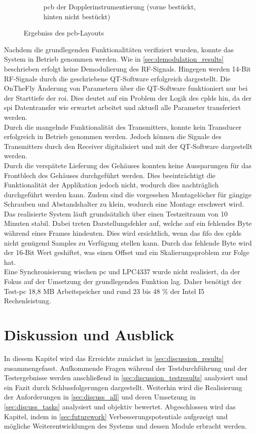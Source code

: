 \begin{figure}[h!]
\begin{subfigure}[b]{1\textwidth}
    	\caption{\ac{pcb} der Dopplerinstrumentierung (vorne bestückt, hinten nicht bestückt)}
		\label{fig:3Dpcb}
    \end{subfigure}
	\caption{Ergebniss des \acs{pcb}-Layouts}\label{fig:pcb}
\end{figure}
Nachdem die grundlegenden Funktionalitäten verifiziert wurden, konnte das System in Betrieb genommen werden. Wie in \autoref{sec:demodulation_results} beschrieben erfolgt keine Demodulierung des RF-Signals. Hingegen werden 14-Bit RF-Signale durch die geschriebene QT-Software erfolgreich dargestellt. Die OnTheFly Änderung von Parametern über die QT-Software funktioniert nur bei der Starttiefe der \ac{roi}. Dies deutet auf ein Problem der Logik des \ac{cpld}s hin, da der \ac{spi} Datentransfer wie erwartet arbeitet und aktuell alle Parameter transferiert werden.\\
Durch die mangelnde Funktionalität des Transmitters, konnte kein Transducer erfolgreich in Betrieb genommen werden. Jedoch können die Signale des Transmitters durch den Receiver digitalisiert und mit der QT-Software dargestellt werden.\\
Durch die verspätete Lieferung des Gehäuses konnten keine Aussparungen für das Frontblech des Gehäuses durchgeführt werden. Dies beeinträchtigt die Funktionalität der Applikation jedoch nicht, wodurch dies nachträglich durchgeführt werden kann. Zudem sind die vorgesehen Montagelöcher für gängige Schrauben und Abstandshalter zu klein, wodurch eine Montage erschwert wird.\\
Das realisierte System läuft grundsätzlich über einen Testzeitraum von 10 Minuten stabil. Dabei treten Darstellungsfehler auf, welche auf ein fehlendes Byte während eines Frames hindeuten. Dies wird ersichtlich, wenn das \ac{fifo} des \ac{cpld}s nicht genügend Samples zu Verfügung stellen kann. Durch das fehlende Byte wird der 16-Bit Wert geshiftet, was einen Offset und ein Skalierungsproblem zur Folge hat.\\
Eine Synchronisierung wischen \ac{pc} und LPC4337 wurde nicht realisiert, da der Fokus auf der Umsetzung der grundlegenden Funktion lag. Daher benötigt der Test-\ac{pc} 18,8 MB Arbeitspeicher und rund 23 bis 48 \% der Intel I5 Rechenleistung.
\chapter{Diskussion und Ausblick}
In diesem Kapitel wird das Erreichte zunächst in \autoref{sec:discussion_results} zusammengefasst. Aufkommende Fragen während der Testdurchführung und der Testergebnisse werden anschließend in \autoref{sec:discussion_testresults} analysiert und ein Fazit durch Schlussfolgerungen dargestellt. Weiterhin wird die Realisierung der Anforderungen in \autoref{sec:discuss_all} und deren Umsetzung in \autoref{sec:discuss_tasks} analysiert und objektiv bewertet. Abgeschlossen wird das Kapitel, indem in \autoref{sec:futurework} Verbesserungspotentiale aufgezeigt und mögliche Weiterentwicklungen des Systems und dessen Module erbracht werden.
